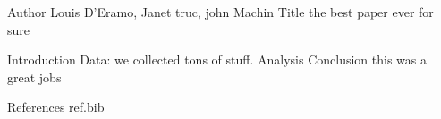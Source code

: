 Author Louis D'Eramo, Janet truc, john Machin
Title the best paper ever for sure

Introduction
Data: we collected tons of stuff.
Analysis
Conclusion this was a great jobs


References 
ref.bib
